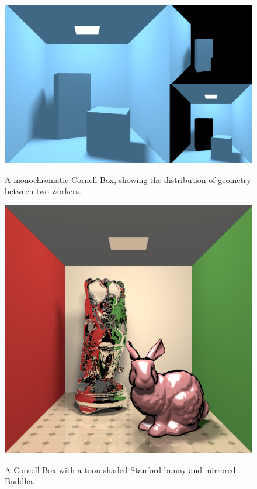 \documentclass[12pt]{ucthesis}
\newcommand{\captionfonts}{\small\bf\ssp}
\begin{document}
\begin{figure}[h!]
    \centering
    \includegraphics[width=140mm]{showoff/distribution.png}
    \captionfonts
    \caption{A monochromatic Cornell Box, showing the distribution of geometry between two workers.}
    \label{fig:sodist}
\end{figure}

\begin{figure}[h!]
    \centering
    \includegraphics[width=140mm]{showoff/cornell-models.png}
    \captionfonts
    \caption{A Cornell Box with a toon shaded Stanford bunny and mirrored Buddha.}
    \label{fig:socornell}
\end{figure}
\end{document}
